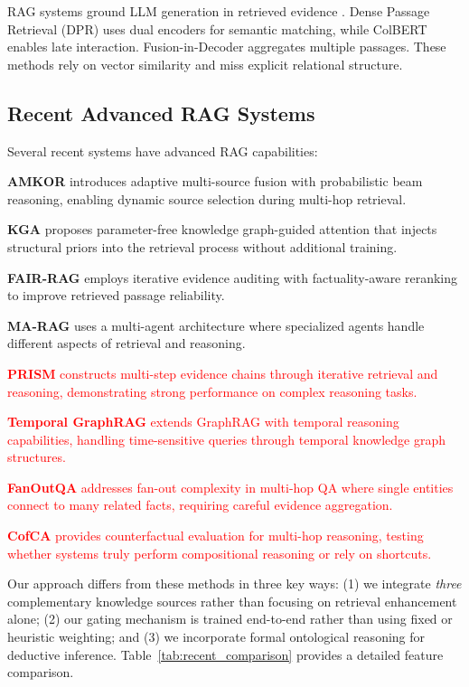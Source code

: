 \documentclass[10pt,twocolumn]{article}
\newcommand{\revisioncritical}[1]{\textcolor{red}{#1}}
\begin{document}
RAG systems ground LLM generation in retrieved evidence \cite{lewis2020rag}. Dense Passage Retrieval (DPR) \cite{karpukhin2020dpr} uses dual encoders for semantic matching, while ColBERT \cite{khattab2020colbert} enables late interaction. Fusion-in-Decoder \cite{izacard2021fid} aggregates multiple passages. These methods rely on vector similarity and miss explicit relational structure.

\subsection{Recent Advanced RAG Systems}
\label{sec:recent_rag}

Several recent systems have advanced RAG capabilities:

\textbf{AMKOR} \cite{fang2024amkor} introduces adaptive multi-source fusion with probabilistic beam reasoning, enabling dynamic source selection during multi-hop retrieval.

\textbf{KGA} \cite{wang2024kga} proposes parameter-free knowledge graph-guided attention that injects structural priors into the retrieval process without additional training.

\textbf{FAIR-RAG} \cite{chen2024fairrag} employs iterative evidence auditing with factuality-aware reranking to improve retrieved passage reliability.

\textbf{MA-RAG} \cite{li2024marag} uses a multi-agent architecture where specialized agents handle different aspects of retrieval and reasoning.

\revisioncritical{\textbf{PRISM} \cite{chen2024prism} constructs multi-step evidence chains through iterative retrieval and reasoning, demonstrating strong performance on complex reasoning tasks.

\textbf{Temporal GraphRAG} \cite{lee2024temporalgraphrag} extends GraphRAG with temporal reasoning capabilities, handling time-sensitive queries through temporal knowledge graph structures.

\textbf{FanOutQA} \cite{zhu2024fanoutqa} addresses fan-out complexity in multi-hop QA where single entities connect to many related facts, requiring careful evidence aggregation.

\textbf{CofCA} \cite{wu2024cofca} provides counterfactual evaluation for multi-hop reasoning, testing whether systems truly perform compositional reasoning or rely on shortcuts.}

Our approach differs from these methods in three key ways: (1) we integrate \textit{three} complementary knowledge sources rather than focusing on retrieval enhancement alone; (2) our gating mechanism is trained end-to-end rather than using fixed or heuristic weighting; and (3) we incorporate formal ontological reasoning for deductive inference. Table~\ref{tab:recent_comparison} provides a detailed feature comparison.
\end{document}
